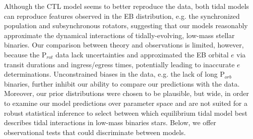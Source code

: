 Although the CTL model seems to better reproduce the \citet{Lurie2017} data, both tidal models can reproduce features observed in the \kepler EB distribution, e.g. the synchronized population and subsynchronous rotators, suggesting that our models reasonably approximate the dynamical interactions of tidally-evolving, low-mass stellar binaries. Our comparison between theory and observations is limited, however, because the \citet{Lurie2017} P$_{rot}$ data lack uncertainties and \citet{Lurie2017} approximated the EB orbital $e$ via transit durations and ingress/egress times, potentially leading to inaccurate $e$ determinations. Unconstrained biases in the data, e.g. the lack of long P$_{orb}$ binaries, further inhibit our ability to compare our predictions with the data. Moreover, our prior distributions were chosen to be plausible, but wide, in order to examine our model predictions over parameter space and are not suited for a robust statistical inference to select between which equilibrium tidal model best describes tidal interactions in low-mass binaries stars. Below, we offer observational tests that could discriminate between models.


